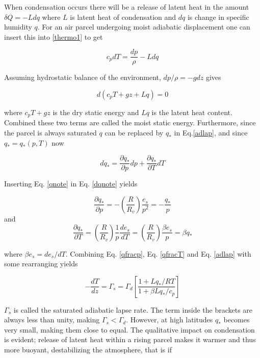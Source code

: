 When condensation occurs there will be a release of latent heat in the amount $\delta Q = -L dq$ where $L$ is latent heat of condensation and $dq$ is change in specific humidity $q$. For an air parcel undergoing moist adiabatic displacement one can insert this into \eqref{thermo1} to get 

\begin{equation}
    c_p dT = \frac{dp}{\rho}-L dq
    \label{adlap}
\end{equation}

Assuming hydrostatic balance of the environment, $dp/\rho = -gdz$ gives

\begin{equation}
    d(c_pT + gz + Lq) = 0
\end{equation}

where $c_pT+gz$ is the dry static energy and $Lq$ is the latent heat content. Combined these two terms are called the moist static energy. Furthermore, since the parcel is always saturated $q$ can be replaced by $q_*$ in Eq.\eqref{adlap}, and since $q_*=q_*(p,T)$ now

\begin{equation}
    dq_* = \frac{\partial q_*}{\partial p}dp + \frac{\partial q_*}{\partial T}dT
    \label{dqnote}
\end{equation}

Inserting Eq. \eqref{qnote} in Eq. \eqref{dqnote} yields 

\begin{equation}
        \frac{\partial q_*}{\partial p} = -(\frac{R}{R_v})\frac{e_s}{p^2} = -\frac{q_*}{p}
        \label{qfracp}
\end{equation}
and
\begin{equation}
            \frac{\partial q_*}{\partial T} = (\frac{R}{R_v})\frac{1}{p}\frac{de_s}{dT} = (\frac{R}{R_v})\frac{\beta e_s}{p} = \beta q_*
            \label{qfracT}
\end{equation}

where $\beta e_s = de_s/dT$. Combining Eq. \eqref{qfracp}, Eq. \eqref{qfracT} and Eq. \eqref{adlap} with some rearranging yields

\begin{equation}
    -\frac{dT}{dz} = \Gamma_s = \Gamma_d \left[\frac{1+Lq_*/RT}{1+\beta Lq_*/c_p} \right]
\end{equation}

$\Gamma_s$ is called the saturated adiabatic lapse rate. The term inside the brackets are always less than unity, making $\Gamma_s < \Gamma_d$. However, at high latitudes $q_*$ becomes very small, making them close to equal. The qualitative impact on condensation is evident; release of latent heat within a rising parcel makes it warmer and thus more buoyant, destabilizing the atmosphere, that is if

